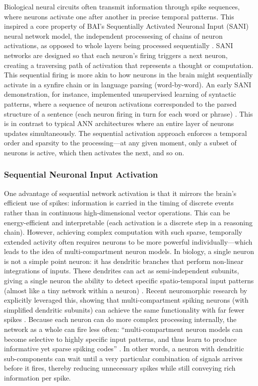 Biological neural circuits often transmit information through spike sequences, where neurons activate one after another in precise temporal patterns.
This inspired a core property of BAI’s Sequentially Activated Neuronal Input (SANI) neural network model, the independent processesing of chains of neuron activations, as opposed to whole layers being processed sequentially \citep{bairesearch2022SANI}.
SANI networks are designed so that each neuron’s firing triggers a next neuron, creating a traversing path of activation that represents a thought or computation.
This sequential firing is more akin to how neurons in the brain might sequentially activate in a synfire chain or in language parsing (word-by-word).
An early SANI demonstration, for instance, implemented unsupervised learning of syntactic patterns, where a sequence of neuron activations corresponded to the parsed structure of a sentence (each neuron firing in turn for each word or phrase) \citep{bairesearch2022SANI, bairesearch2022SANINLPtf}.
This is in contrast to typical ANN architectures where an entire layer of neurons updates simultaneously.
The sequential activation approach enforces a temporal order and sparsity to the processing---at any given moment, only a subset of neurons is active, which then activates the next, and so on.

\subsubsection{Sequential Neuronal Input Activation}

One advantage of sequential network activation is that it mirrors the brain’s efficient use of spikes: information is carried in the timing of discrete events rather than in continuous high-dimensional vector operations.
This can be energy-efficient and interpretable (each activation is a discrete step in a reasoning chain).
However, achieving complex computation with such sparse, temporally extended activity often requires neurons to be more powerful individually---which leads to the idea of multi-compartment neuron models.
In biology, a single neuron is not a simple point neuron: it has dendritic branches that perform non-linear integrations of inputs.
These dendrites can act as semi-independent subunits, giving a single neuron the ability to detect specific spatio-temporal input patterns (almost like a tiny network within a neuron) \citep{london2005dendriticComputation}.
Recent neuromorphic research by \citet{leugering2020spiking} explicitly leveraged this, showing that multi-compartment spiking neurons (with simplified dendritic subunits) can achieve the same functionality with far fewer spikes \citep{leugering2020spiking}.
Because each neuron can do more complex processing internally, the network as a whole can fire less often: ``multi-compartment neuron models can become selective to highly specific input patterns, and thus learn to produce informative yet sparse spiking codes'' \citep{leugering2020spiking}.
In other words, a neuron with dendritic sub-components can wait until a very particular combination of signals arrives before it fires, thereby reducing unnecessary spikes while still conveying rich information per spike.

